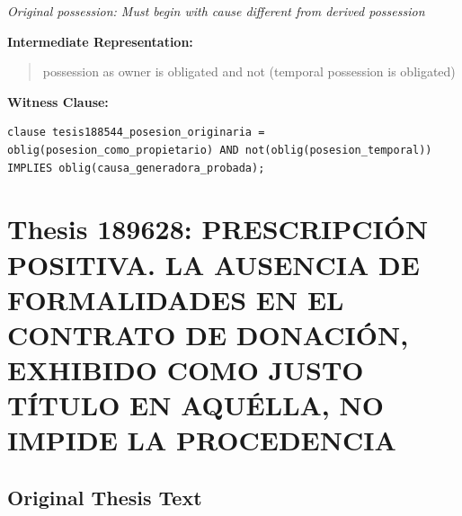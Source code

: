 \documentclass[11pt,a4paper]{article}
\begin{document}
\textit{Original possession: Must begin with cause different from derived possession}

\textbf{Intermediate Representation:}

\begin{quote}
possession as owner is obligated and not (temporal possession is obligated)
\end{quote}

\textbf{Witness Clause:}

\begin{lstlisting}[style=witnessstyle, language=Witness]
clause tesis188544_posesion_originaria = oblig(posesion_como_propietario) AND not(oblig(posesion_temporal)) IMPLIES oblig(causa_generadora_probada);
\end{lstlisting}

\newpage

\section{Thesis 189628: PRESCRIPCIÓN POSITIVA. LA AUSENCIA DE FORMALIDADES EN EL CONTRATO DE DONACIÓN, EXHIBIDO COMO JUSTO TÍTULO EN AQUÉLLA, NO IMPIDE LA PROCEDENCIA}
\label{thesis:189628}

\subsection{Original Thesis Text}
\end{document}
